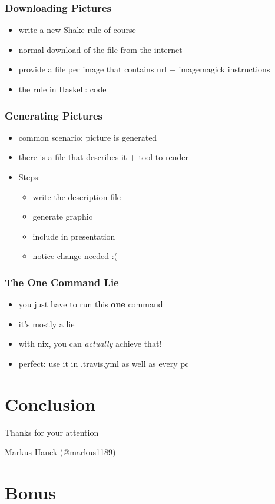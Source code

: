 \documentclass{beamer}
\begin{document}
\begin{frame}
  \frametitle{Downloading Pictures}
  \begin{itemize}
  \item write a new Shake rule of course
  \item normal download of the file from the internet
  \item provide a file per image that contains url + imagemagick instructions
  \item the rule in Haskell: code
  \end{itemize}
\end{frame}

\begin{frame}
  \frametitle{Generating Pictures}
  \begin{itemize}
  \item common scenario: picture is generated
  \item there is a file that describes it + tool to render
  \item Steps:
    \begin{itemize}
    \item write the description file
    \item generate graphic
    \item include in presentation
    \item notice change needed :(
    \end{itemize}
  \end{itemize}
\end{frame}

\begin{frame}
  \frametitle{The One Command Lie}
  \begin{itemize}
  \item you just have to run this \textbf{one} command
  \item it's mostly a lie
  \item with nix, you can \textit{actually} achieve that!
  \item perfect: use it in .travis.yml as well as every pc
  \end{itemize}
\end{frame}



\section{Conclusion}\label{sec:conclusion}

\begin{frame}
  \begin{center}
    \Huge
    Thanks for your attention
  \end{center}
  \begin{center}
    \Huge
    Markus Hauck (@markus1189)
  \end{center}
\end{frame}

\begin{frame}
  \tableofcontents{}
\end{frame}

\appendix{}

\section*{Bonus}\label{sec:bonus}
\end{document}
